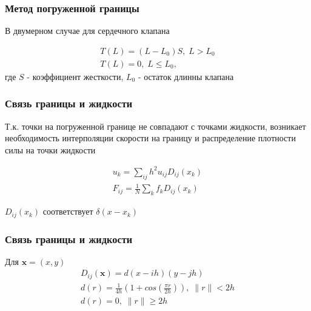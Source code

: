 \documentclass[14pt]{beamer}
\begin{document}
\begin{frame}
\frametitle{Метод погруженной границы}
В двумерном случае для сердечного клапана

\begin{gather}
\label{eq:valve_leaflet}
T(L)=(L-L_0)S, \; L > L_0 \\
T(L)=0, \; L \leq L_0,
\end{gather}
где $S$ - коэффициент жесткости, $L_0$ - остаток длинны клапана
\end{frame}

\begin{frame}
\frametitle{Связь границы и жидкости}
Т.к. точки на погруженной границе не совпадают с точками жидкости, возникает необходимость интерполяции скорости на границу и распределение плотности силы на точки жидкости

\begin{gather}
\label{eq:interpolation}
u_k = \sum_{ij}h^{2} u_{ij} D_{ij}(x_k) \\
\label{eq:spreading}
F_{ij} = \frac{1}{N} \sum_k f_k D_{ij}(x_k)
\end{gather}

$D_{ij}(x_k)$ соответствует $\delta(x-x_k)$
\end{frame}

\begin{frame}
\frametitle{Связь границы и жидкости}
Для $\bm x=(x, y)$
\begin{gather}
\label{eq:force}
D_{ij}(\bm x) = d(x-ih)(y-jh) \\
\label{eq:delta_function}
d(r) = \frac{1}{4h}(1 + cos(\frac{\pi r}{2h})), \; \|r\| < 2h \\
d(r) = 0, \; \|r\| \geq 2h
\end{gather}
\end{frame}
\end{document}

